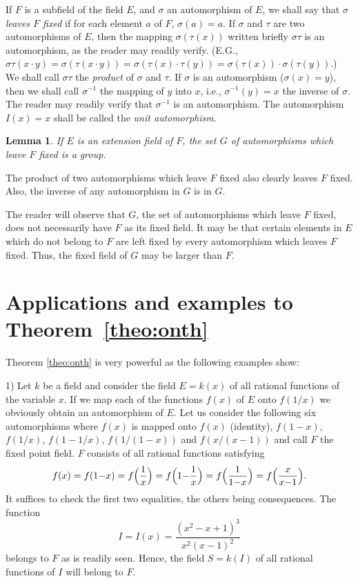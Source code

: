 \documentclass[10pt,leqno,a5paper]{book}
\newtheorem*{lemm*}{Lemma}
\theoremstyle{definition}
\let\htw\section
\begin{document}
If $F$ is a subfield of the field $E$, and $\sigma$ an automorphism of $E$, we shall say that $\sigma$ \emph{leaves $F$ fixed} if for each element $a$ of $F$, $\sigma(a) = a$.
If $\sigma$ and $\tau$ are two automorphisms of $E$, then the mapping $\sigma(\tau(x))$ written briefly $\sigma\tau$ is an automorphism, as the reader may readily verify.
(E.G., $\sigma\tau(x\cdot y) = \sigma(\tau(x \cdot y)) = \sigma(\tau(x) \cdot \tau(y)) = \sigma(\tau(x)) \cdot \sigma(\tau(y))$.)
We shall call $\sigma\tau$ the \emph{product} of $\sigma$ and $\tau$.
If $\sigma$ is an automorphism ($\sigma(x) = y$), then we shall call $\sigma^{-1}$ the mapping of $y$ into $x$, i.e., $\sigma^{-1}(y) = x$ the inverse of $\sigma$.\label{p38}
The reader may readily verify that $\sigma^{-1}$ is an automorphism.
The automorphism $I(x) = x$ shall be called the \emph{unit automorphism}.


\begin{lemm*}
If $E$ is an extension field of $F$, the set $G$ of automorphisms which leave $F$ fixed is a group.
\end{lemm*}


The product of two automorphisms which leave $F$ fixed also clearly leaves $F$ fixed.
Also, the inverse of any automorphism in $G$ is in $G$.

The reader will observe that $G$, the set of automorphisms which leave $F$ fixed, does not necessarily have $F$ as its fixed field.
It may be that certain elements in $E$ which do not belong to $F$ are left fixed by every automorphism which leaves $F$ fixed.
Thus, the fixed field of $G$ may be larger than $F$.


\htw[Applications and examples]{Applications and examples to Theorem~\ref{theo:onth}}


Theorem \ref{theo:onth} is very powerful as the following examples show:


1)
Let $k$ be a field and consider the field $E = k(x)$ of all rational functions of the variable $x$.
If we map each of the functions $f(x)$ of $E$ onto $f(1/x)$ we obviously obtain an automorphism of $E$.
Let us consider the following six automorphisms where $f(x)$ is mapped onto $f(x)$ (identity), $f(1-x)$, $f(1/x)$, $f(1-1/x)$, $f(1/(1-x))$ and $f(x/(x-1))$ and call $F$ the fixed point field.
$F$ consists of all rational functions satisfying
\begin{equation}
\label{eq:twGon}
f(x)
= f(1{-}x)
= f\Bigl(\frac 1x\Bigr)
= f\Bigl(1 {-} \frac 1x\Bigr)
= f\Bigl(\frac 1{1{-}x}\Bigr)
= f\Bigl(\frac{x}{x{-}1}\Bigr).
\end{equation}
It suffices to check the first two equalities, the others being consequences.
The function
\begin{equation}
\label{eq:twGtw}
I = I(x) = \frac{(x^2 - x + 1)^3}{x^2(x-1)^2}
\end{equation}
belongs to $F$ as is readily seen.
Hence, the field $S = k(I)$ of all rational functions of $I$ will belong to $F$.
\end{document}

